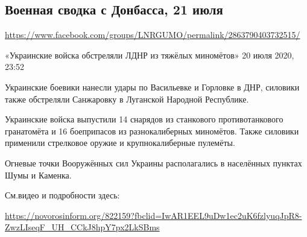  
 
  
\subsection{Военная сводка с Донбасса, 21 июля}
\label{sec:21_07_2020.fb.lnr.20}
\url{https://www.facebook.com/groups/LNRGUMO/permalink/2863790403732515/}

«Украинские войска обстреляли ЛДНР из тяжёлых миномётов» 20 июля 2020, 23:52

Украинские боевики нанесли удары по Васильевке и Горловке в ДНР, силовики также
обстреляли Санжаровку в Луганской Народной Республике.

Украинские войска выпустили 14 снарядов из станкового противотанкового
гранатомёта и 16 боеприпасов из разнокалиберных миномётов.  Также силовики
применили стрелковое оружие и крупнокалиберные пулемёты.

Огневые точки Вооружённых сил Украины располагались в населённых пунктах Шумы и
Каменка.

См.видео и подробности здесь:

\url{https://novorosinform.org/822159?fbclid=IwAR1EEL9uDw1ec2uK6fzlyuqJpR8-ZwzLIseqF_UH_CCkJ8hpY7px2LkSBms}
  
